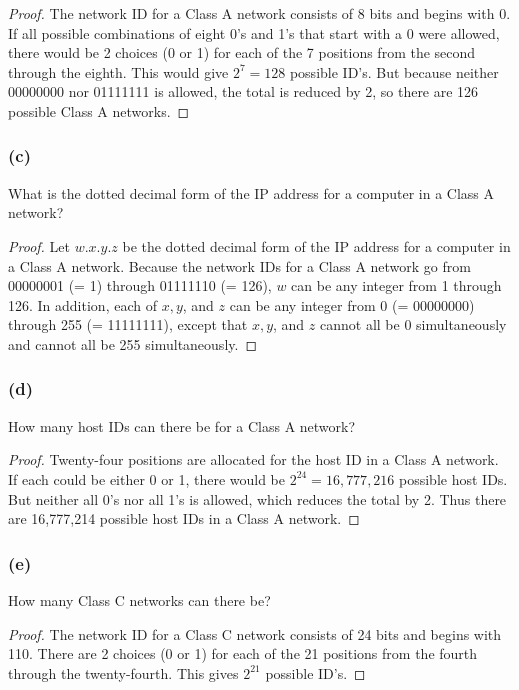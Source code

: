 \documentclass[14pt]{extarticle}
\begin{document}
\begin{proof}
     The network ID for a Class A network consists of 8 bits and begins with 0. If all possible combinations of eight 0’s
     and 1’s that start with a 0 were allowed, there would be 2 choices (0 or 1) for each of the 7 positions from the
     second through the eighth. This would give \(2^7 = 128\) possible ID’s. But because neither 00000000 nor 01111111 is
     allowed, the total is reduced by 2, so there are 126 possible Class A networks.
\end{proof}

\subsubsection{(c)}
What is the dotted decimal form of the IP address for a computer in a Class A network?

\begin{proof}
     Let \(w.x.y.z\) be the dotted decimal form of the IP address for a computer in a Class A network. Because the
     network IDs for a Class A network go from 00000001 (= 1) through 01111110 (= 126), $w$ can be any integer from 1
     through 126. In addition, each of \(x, y\), and \(z\) can be any integer from 0 (= 00000000) through 255 (=
     11111111), except that \(x, y\), and \(z\) cannot all be 0 simultaneously and cannot all be 255 simultaneously.
\end{proof}

\subsubsection{(d)}
How many host IDs can there be for a Class A network?

\begin{proof}
     Twenty-four positions are allocated for the host ID in a Class A network. If each could be either 0 or 1, there
     would be \(2^{24} = 16,777,216\) possible host IDs. But neither all 0’s nor all 1’s is allowed, which reduces the
     total by 2. Thus there are 16,777,214 possible host IDs in a Class A network.
\end{proof}

\subsubsection{(e)}
How many Class C networks can there be?

\begin{proof}
     The network ID for a Class C network consists of 24 bits and begins with 110. There are 2 choices (0 or 1) for each
     of the 21 positions from the fourth through the twenty-fourth. This gives \(2^{21}\) possible ID’s.
\end{proof}
\end{document}
